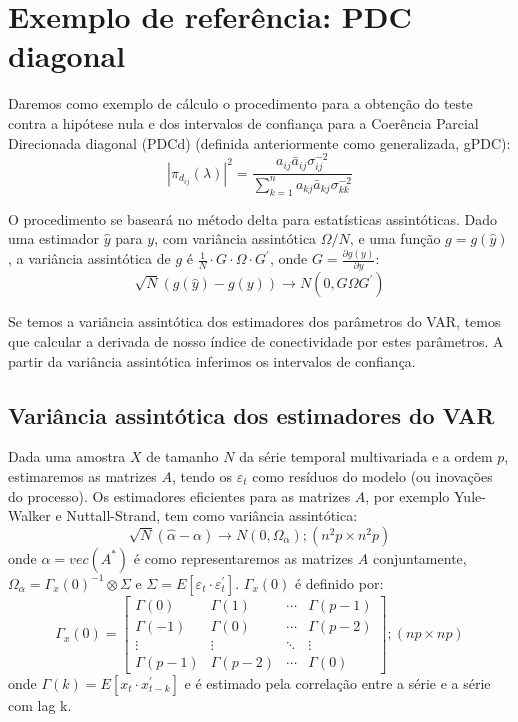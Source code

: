 \documentclass[a4paper,10pt]{article}
\begin{document}
\section{Exemplo de referência: PDC diagonal}

Daremos como exemplo de cálculo o procedimento para a obtenção do teste contra a hipótese nula e dos intervalos de confiança para a Coerência Parcial Direcionada diagonal (PDCd) (definida anteriormente como generalizada, gPDC):
\begin{equation}
|\pi_{d_{ij}}(\lambda)|^{2} = \frac{a_{ij} \bar{a}_{ij} \sigma_{ij}^{-2}} {\sum_{k=1}^{n}{a_{kj} \bar{a}_{kj} \sigma_{kk}^{-2}}}
\end{equation}

O procedimento se baseará no método delta para estatísticas assintóticas. Dado uma estimador $\hat{y}$ para $y$, com variância assintótica $\Omega/N$, e uma função $g = g(\hat{y})$, a variância assintótica de $g$ é $\frac{1}{N} \cdot G \cdot \Omega \cdot G^{'}$, onde $G = \frac{\partial g(y)}{\partial y}$:
\begin{equation} 
\sqrt{N} (g(\hat{y}) - g(y)) \to N(0, G \Omega G^{'})
\end{equation}


Se temos a variância assintótica dos estimadores dos parâmetros do VAR, temos que calcular a derivada de nosso índice de conectividade por estes parâmetros. A partir da variância assintótica inferimos os intervalos de confiança.

\subsection{Variância assintótica dos estimadores do VAR}

Dada uma amostra $X$ de tamanho $N$ da série temporal multivariada e a ordem $p$, estimaremos as matrizes $A$, tendo os $\varepsilon_{t}$ como resíduos do modelo (ou inovações do processo). Os estimadores eficientes para as matrizes $A$, por exemplo Yule-Walker e Nuttall-Strand, tem como variância assintótica:
\begin{equation}
\sqrt{N} (\hat{\alpha} - \alpha) \to N(0,\Omega_{\alpha}); (n^{2}p \times n^{2}p)
\end{equation}
onde $\alpha = vec(A^{\ast})$ é como representaremos as matrizes $A$ conjuntamente, $\Omega_{\alpha} = \Gamma_{x}(0)^{-1}\otimes \Sigma$ e $\Sigma = E[\varepsilon_{t}\cdot \varepsilon_{t}^{'}]$. $\Gamma_{x}(0)$ é definido por:
\begin{equation}
\Gamma_{x}(0) = \left[ \begin{array}{cccc} 
\Gamma(0) & \Gamma(1) & \cdots & \Gamma(p-1) \\
\Gamma(-1) & \Gamma(0) & \cdots & \Gamma(p-2) \\
\vdots & \vdots & \ddots & \vdots \\
\Gamma(p-1) & \Gamma(p-2) & \cdots & \Gamma(0) \end{array} \right]; (np \times np)
\end{equation}
onde $\Gamma(k) = E[x_{t} \cdot x_{t-k}^{'}]$ e é estimado pela correlação entre a série e a série com lag k.
\end{document}
